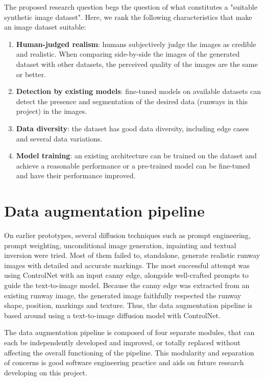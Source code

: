 The proposed research question begs the question of what constitutes a "suitable synthetic image dataset". Here, we rank the following characteristics that make an image dataset suitable:

\label{sec:suitable-dataset}
\begin{enumerate}
    \item \textbf{Human-judged realism}: humans subjectively judge the images as credible and realistic. When comparing side-by-side the images of the generated dataset with other datasets, the perceived quality of the images are the same or better.
    \item \textbf{Detection by existing models}: fine-tuned models on available datasets can detect the presence and segmentation of the desired data (runways in this project) in the images.
    \item \textbf{Data diversity}: the dataset has good data diversity, including edge cases and several data variations.
    \item \textbf{Model training}: an existing architecture can be trained on the dataset and achieve a reasonable performance or a pre-trained model can be fine-tuned and have their performance improved.
\end{enumerate}

\section{Data augmentation pipeline}

On earlier prototypes, several diffusion techniques such as prompt engineering, prompt weighting, unconditional image generation, inpainting and textual inversion were tried. Most of them failed to, standalone, generate realistic runway images with detailed and accurate markings. The most successful attempt was using ControlNet with an input canny edge, alongside well-crafted prompts to guide the text-to-image model. Because the canny edge was extracted from an existing runway image, the generated image faithfully respected the runway shape, position, markings and texture. Thus, the data augmentation pipeline is based around using a text-to-image diffusion model with ControlNet.

The data augmentation pipeline is composed of four separate modules, that can each be independently developed and improved, or totally replaced without affecting the overall functioning of the pipeline. This modularity and separation of concerns is good software engineering practice and aids on future research developing on this project.

